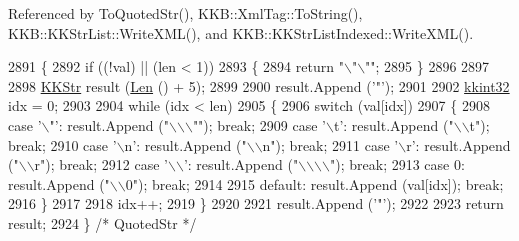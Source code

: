 Referenced by To\+Quoted\+Str(), K\+K\+B\+::\+Xml\+Tag\+::\+To\+String(), K\+K\+B\+::\+K\+K\+Str\+List\+::\+Write\+X\+M\+L(), and K\+K\+B\+::\+K\+K\+Str\+List\+Indexed\+::\+Write\+X\+M\+L().


\begin{DoxyCode}
2891 \{
2892   \textcolor{keywordflow}{if}  ((!val)  ||  (len < 1))
2893   \{
2894     \textcolor{keywordflow}{return} \textcolor{stringliteral}{"\(\backslash\)"\(\backslash\)""};
2895   \}
2896   
2897   
2898   \hyperlink{class_k_k_b_1_1_k_k_str}{KKStr}  result (\hyperlink{class_k_k_b_1_1_k_k_str_a869142d4855517c5c237afcb25dbbe36}{Len} () + 5);
2899 
2900   result.Append (\textcolor{charliteral}{'"'});
2901 
2902   \hyperlink{namespace_k_k_b_a8fa4952cc84fda1de4bec1fbdd8d5b1b}{kkint32}  idx = 0;
2903 
2904   \textcolor{keywordflow}{while}  (idx < len)
2905   \{
2906     \textcolor{keywordflow}{switch}  (val[idx])
2907     \{
2908       \textcolor{keywordflow}{case}  \textcolor{charliteral}{'\(\backslash\)"'}: result.Append (\textcolor{stringliteral}{"\(\backslash\)\(\backslash\)\(\backslash\)""});  \textcolor{keywordflow}{break};
2909       \textcolor{keywordflow}{case}  \textcolor{charliteral}{'\(\backslash\)t'}: result.Append (\textcolor{stringliteral}{"\(\backslash\)\(\backslash\)t"});   \textcolor{keywordflow}{break};
2910       \textcolor{keywordflow}{case}  \textcolor{charliteral}{'\(\backslash\)n'}: result.Append (\textcolor{stringliteral}{"\(\backslash\)\(\backslash\)n"});   \textcolor{keywordflow}{break};
2911       \textcolor{keywordflow}{case}  \textcolor{charliteral}{'\(\backslash\)r'}: result.Append (\textcolor{stringliteral}{"\(\backslash\)\(\backslash\)r"});   \textcolor{keywordflow}{break};
2912       \textcolor{keywordflow}{case}  \textcolor{charliteral}{'\(\backslash\)\(\backslash\)'}: result.Append (\textcolor{stringliteral}{"\(\backslash\)\(\backslash\)\(\backslash\)\(\backslash\)"});  \textcolor{keywordflow}{break};
2913       \textcolor{keywordflow}{case}     0: result.Append (\textcolor{stringliteral}{"\(\backslash\)\(\backslash\)0"});   \textcolor{keywordflow}{break};
2914          
2915       \textcolor{keywordflow}{default}:     result.Append (val[idx]);   \textcolor{keywordflow}{break};
2916     \}
2917 
2918     idx++;
2919   \}
2920 
2921   result.Append (\textcolor{charliteral}{'"'});
2922 
2923   \textcolor{keywordflow}{return}  result;
2924 \}  \textcolor{comment}{/* QuotedStr */}
\end{DoxyCode}
